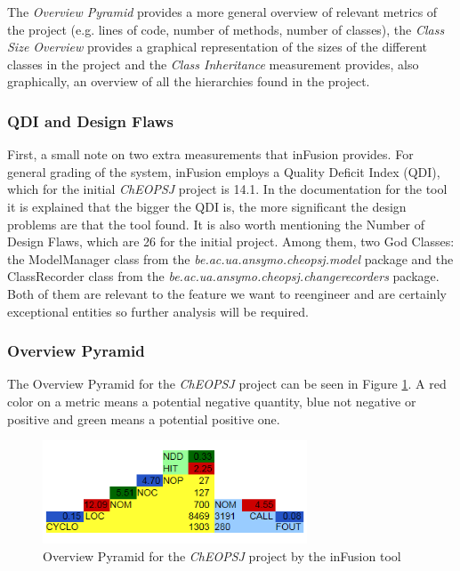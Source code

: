 \documentclass{article}
\begin{document}
The \emph{Overview Pyramid} provides a more general overview of relevant metrics of the project (e.g. lines of code, number of methods, number of classes), the \emph{Class Size Overview} provides a graphical representation of the sizes of the different classes in the project and the \emph{Class Inheritance} measurement provides, also graphically, an overview of all the hierarchies found in the project.

\subsubsection{QDI and Design Flaws}
First, a small note on two extra measurements that inFusion provides. For general grading of the system, inFusion employs a Quality Deficit Index (QDI), which for the initial \emph{ChEOPSJ} project is 14.1. In the documentation for the tool it is explained that the bigger the QDI is, the more significant the design problems are that the tool found. It is also worth mentioning the Number of Design Flaws, which are 26 for the initial project. Among them, two God Classes: the ModelManager class from the \emph{be.ac.ua.ansymo.cheopsj.model} package and the ClassRecorder class from the \emph{be.ac.ua.ansymo.cheopsj.changerecorders} package. Both of them are relevant to the feature we want to reengineer and are certainly exceptional entities so further analysis will be required.

\subsubsection{Overview Pyramid}
The Overview Pyramid for the \emph{ChEOPSJ} project can be seen in Figure \ref{fig:pyramid}.
A red color on a metric means a potential negative quantity, blue not negative or positive and green means a potential positive one.

\begin{figure}[h]
\centering
\includegraphics[width=0.7\textwidth]{Images/overviewPyramid}
\caption{Overview Pyramid for the \emph{ChEOPSJ} project by the inFusion tool}
\label{fig:pyramid}
\end{figure}
\end{document}
